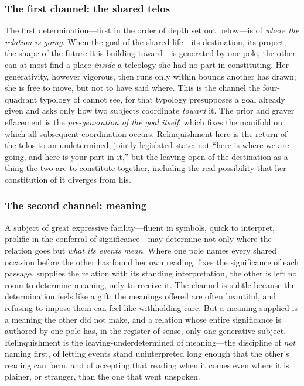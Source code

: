 \subsubsection{The first channel: the shared telos}
The first determination---first in the order of depth set out below---is of \emph{where the relation is going}. When the goal of the shared life---its destination, its project, the shape of the future it is building toward---is generated by one pole, the other can at most find a place \emph{inside} a teleology she had no part in constituting. Her generativity, however vigorous, then runs only within bounds another has drawn; she is free to move, but not to have said where. This is the channel the four-quadrant typology of  cannot see, for that typology presupposes a goal already given and asks only how two subjects coordinate \emph{toward} it. The prior and graver effacement is the \emph{pre-generation of the goal itself}, which fixes the manifold on which all subsequent coordination occurs. Relinquishment here is the return of the telos to an undetermined, jointly legislated state: not ``here is where we are going, and here is your part in it,'' but the leaving-open of the destination as a thing the two are to constitute together, including the real possibility that her constitution of it diverges from his.

\subsubsection{The second channel: meaning}
A subject of great expressive facility---fluent in symbols, quick to interpret, prolific in the conferral of significance---may determine not only where the relation goes but \emph{what its events mean}. Where one pole names every shared occasion before the other has found her own reading, fixes the significance of each passage, supplies the relation with its standing interpretation, the other is left no room to determine meaning, only to receive it. The channel is subtle because the determination feels like a gift: the meanings offered are often beautiful, and refusing to impose them can feel like withholding care. But a meaning supplied is a meaning the other did not make, and a relation whose entire significance is authored by one pole has, in the register of sense, only one generative subject. Relinquishment is the leaving-underdetermined of meaning---the discipline of \emph{not} naming first, of letting events stand uninterpreted long enough that the other's reading can form, and of accepting that reading when it comes even where it is plainer, or stranger, than the one that went unspoken.


